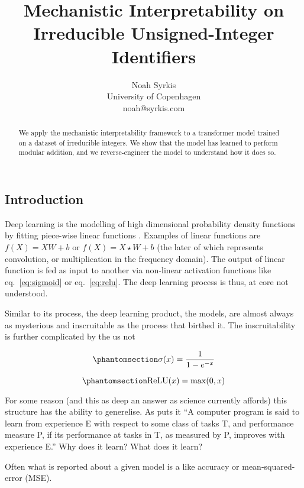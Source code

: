 \documentclass[11pt]{article} %
\title{Mechanistic Interpretability on Irreducible Unsigned-Integer
Identifiers}
\author{Noah Syrkis \\ University of Copenhagen \\ noah@syrkis.com}
\date{}
\begin{document}
\maketitle %
\begin{multicols}{2}
  \begin{abstract}
  We apply the mechanistic interpretability framework to a transformer model trained on a dataset of irreducible integers. We show that the model has learned to perform modular addition, and we reverse-engineer the model to understand how it does so.
  \end{abstract}

  \section{Introduction}\label{introduction}

  Deep learning is the modelling of high dimensional probability density
  functions by fitting piece-wise linear functions
  \autocite{prince2023}. Examples of linear functions are \(f(X)=XW+b\)
  or \(f(X)=X\star W + b\) (the later of which represents convolution,
  or multiplication in the frequency domain). The output of linear
  function is fed as input to another via non-linear activation
  functions like eq.~\ref{eq:sigmoid} or eq.~\ref{eq:relu}. The deep
  learning process is thus, at core not understood.

  Similar to its process, the deep learning product, the models, are
  almost always as mysterious and inscruitable as the process that
  birthed it. The inscruitability is further complicated by the us not

  \begin{equation}\phantomsection\label{eq:sigmoid}{\sigma(x)=\frac{1}{1-e^{-x}}}\end{equation}

  \begin{equation}\phantomsection\label{eq:relu}{\text{ReLU}(x)=\max(0, x)}\end{equation}

  For some reason (and this as deep an answer as science currently
  affords) this structure has the ability to generelise. As
  \textcite{mitchell1997} puts it ``A computer program is said to learn
  from experience E with respect to some class of tasks T, and
  performance measure P, if its performance at tasks in T, as measured
  by P, improves with experience E.'' Why does it learn? What does it
  learn?

  Often what is reported about a given model is a like accuracy or
  mean-squared-error (MSE).


\end{multicols}
\end{document}

